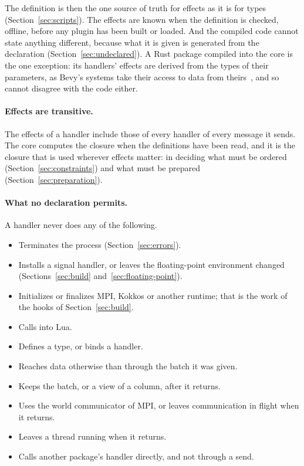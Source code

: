 \documentclass[11pt,a4paper]{article}
\begin{document}
The definition is then the one source of truth for effects as it is for
types (Section~\ref{sec:scripts}).  The effects are known when the
definition is checked, offline, before any plugin has been built or loaded.
And the compiled code cannot state anything different, because what it is
given is generated from the declaration (Section~\ref{sec:undeclared}).  A
Rust package compiled into the core is the one exception: its handlers'
effects are derived from the types of their parameters, as Bevy's systems
take their access to data from theirs~\cite{bevyecs}, and so cannot disagree
with the code either.

\paragraph{Effects are transitive.}  The effects of a handler include those
of every handler of every message it sends.  The core computes the closure
when the definitions have been read, and it is the closure that is used
wherever effects matter: in deciding what must be ordered
(Section~\ref{sec:constraints}) and what must be prepared
(Section~\ref{sec:preparation}).

\paragraph{What no declaration permits.}  A handler never does any of the
following.

\begin{itemize}
  \item Terminates the process (Section~\ref{sec:errors}).
  \item Installs a signal handler, or leaves the floating-point environment
        changed (Sections~\ref{sec:build} and~\ref{sec:floating-point}).
  \item Initializes or finalizes MPI, Kokkos or another runtime; that is the
        work of the hooks of Section~\ref{sec:build}.
  \item Calls into Lua.
  \item Defines a type, or binds a handler.
  \item Reaches data otherwise than through the batch it was given.
  \item Keeps the batch, or a view of a column, after it returns.
  \item Uses the world communicator of MPI, or leaves communication in
        flight when it returns.
  \item Leaves a thread running when it returns.
  \item Calls another package's handler directly, and not through a send.
\end{itemize}
\end{document}
